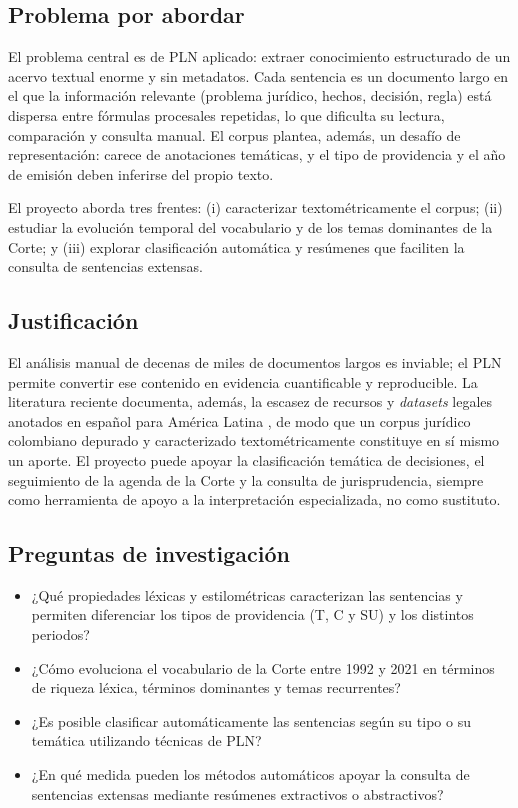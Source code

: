 \documentclass[stu,12pt,spanish,floatsintext,natbib]{apa7}
\begin{document}
\subsection{Problema por abordar}
El problema central es de PLN aplicado: extraer conocimiento estructurado
de un acervo textual enorme y sin metadatos. Cada sentencia es un
documento largo en el que la información relevante (problema jurídico,
hechos, decisión, regla) está dispersa entre fórmulas procesales
repetidas, lo que dificulta su lectura, comparación y consulta manual. El
corpus plantea, además, un desafío de representación: carece de
anotaciones temáticas, y el tipo de providencia y el año de emisión deben
inferirse del propio texto.

El proyecto aborda tres frentes: (i) caracterizar textométricamente el
corpus; (ii) estudiar la evolución temporal del vocabulario y de los temas
dominantes de la Corte; y (iii) explorar clasificación automática y
resúmenes que faciliten la consulta de sentencias extensas.

\subsection{Justificación}
El análisis manual de decenas de miles de documentos largos es inviable;
el PLN permite convertir ese contenido en evidencia cuantificable y
reproducible. La literatura reciente documenta, además, la escasez de
recursos y \emph{datasets} legales anotados en español para América
Latina \citep{loffler2025predicting}, de modo que un corpus jurídico
colombiano depurado y caracterizado textométricamente constituye en sí
mismo un aporte. El proyecto puede apoyar la clasificación temática de
decisiones, el seguimiento de la agenda de la Corte y la consulta de
jurisprudencia, siempre como herramienta de apoyo a la interpretación
especializada, no como sustituto.

\subsection{Preguntas de investigación}
\begin{itemize}
  \item ¿Qué propiedades léxicas y estilométricas caracterizan las
    sentencias y permiten diferenciar los tipos de providencia (T, C y
    SU) y los distintos periodos?
  \item ¿Cómo evoluciona el vocabulario de la Corte entre 1992 y 2021 en
    términos de riqueza léxica, términos dominantes y temas recurrentes?
  \item ¿Es posible clasificar automáticamente las sentencias según su
    tipo o su temática utilizando técnicas de PLN?
  \item ¿En qué medida pueden los métodos automáticos apoyar la consulta
    de sentencias extensas mediante resúmenes extractivos o abstractivos?
\end{itemize}
\end{document}
